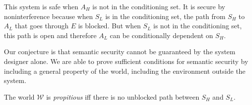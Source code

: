 \documentclass[../thesis.tex]{subfiles}
\begin{document}
\begin{center}
\end{center}

This system is safe when $A_H$ is not in the conditioning
set.
It is secure by noninterference because when $S_L$
is in the conditioning set, the path from $S_H$
to $A_L$ that goes through $E$ is blocked.
But when $S_L$ is not in the conditioning set,
this path is open and therefore $A_L$ can
be conditionally dependent on $S_H$. 

%
%
%
%
%
%
%
%

Our conjecture is that semantic security
cannot be guaranteed by the system designer alone.
We are able to prove sufficient conditions for
semantic security by including a general
property of the world, including the
environment outside the system.

\begin{dfn}[Propitious]
  The world $\mathcal{W}$ is \emph{propitious}
  iff there is no unblocked path between
  $S_H$ and $S_L$.
\end{dfn}
\end{document}
